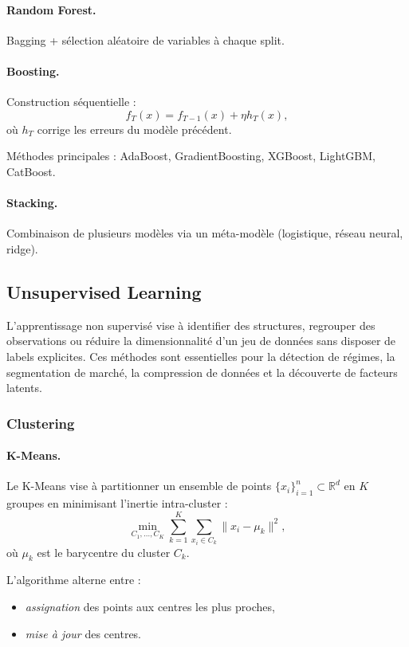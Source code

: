 \documentclass[11pt,a4paper]{article}
\newcommand{\1}{\mathbf{1}}
\begin{document}
\paragraph{Random Forest.}
Bagging + sélection aléatoire de variables à chaque split.

\paragraph{Boosting.}
Construction séquentielle :
\[
f_T(x) = f_{T-1}(x) + \eta h_T(x),
\]
où $h_T$ corrige les erreurs du modèle précédent.

Méthodes principales : AdaBoost, GradientBoosting, XGBoost, LightGBM, CatBoost.

\paragraph{Stacking.}
Combinaison de plusieurs modèles via un méta-modèle (logistique, réseau
neural, ridge).

\subsection{Unsupervised Learning}

L'apprentissage non supervisé vise à identifier des structures, regrouper des
observations ou réduire la dimensionnalité d'un jeu de données sans disposer
de labels explicites. Ces méthodes sont essentielles pour la détection de
régimes, la segmentation de marché, la compression de données et la découverte
de facteurs latents.

\subsubsection{Clustering}

\paragraph{K-Means.}

Le K-Means vise à partitionner un ensemble de points
$\{x_i\}_{i=1}^n \subset \mathbb{R}^d$
en $K$ groupes en minimisant l'inertie intra-cluster :
\[
\min_{C_1,\dots,C_K}
\sum_{k=1}^K \sum_{x_i \in C_k} \|x_i - \mu_k\|^2,
\]
o\`u $\mu_k$ est le barycentre du cluster $C_k$.

L'algorithme alterne entre :
\begin{itemize}
  \item \textit{assignation} des points aux centres les plus proches,
  \item \textit{mise à jour} des centres.
\end{itemize}
\end{document}
